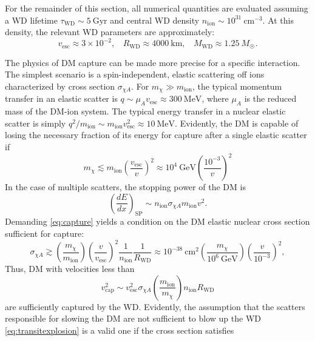 \documentclass[preprintnumbers,amsmath,amssymb,prd,superscriptaddress]{revtex4}
\newcommand{\GeV}{\text{GeV}}
\newcommand{\MeV}{\text{MeV}}
\newcommand{\cm}{\text{cm}}
\def\r{\right)}
\def\l{\left(}
\begin{document}
For the remainder of this section, all numerical quantities are evaluated assuming a WD lifetime $\tau_\text{WD} \sim 5 ~\text{Gyr}$ and central WD density $n_\text{ion} \sim 10^{31} ~\cm^{-3}$. 
At this density, the relevant WD parameters are approximately: 
\begin{equation}
v_\text{esc} \approx 3 \times 10^{-2}, ~~~~ R_\text{WD} \approx 4000 ~\text{km}, ~~~~ M_\text{WD} \approx 1.25 ~M_{\astrosun}. 
\end{equation}

The physics of DM capture can be made more precise for a specific interaction.
The simplest scenario is a spin-independent, elastic scattering off ions characterized by cross section $\sigma_{\chi A}$. 
For $m_\chi \gg m_\text{ion}$, the typical momentum transfer in an elastic scatter is $q \sim \mu_{A} v_\text{esc} \approx 300 ~\MeV$, where $\mu_{A}$ is the reduced mass of the DM-ion system. 
The typical energy transfer in a nuclear elastic scatter is simply $q^2/m_\text{ion} \sim m_\text{ion} v_\text{esc}^2 \approx 10 ~\MeV$. 
Evidently, the DM is capable of losing the necessary fraction of its energy for capture after a single elastic scatter if
\begin{equation}
m_\chi \lesssim m_\text{ion} \l \frac{v_\text{esc}}{v} \r^2 \approx 10^4 ~\GeV \l \frac{10^{-3}}{v} \r^2
\end{equation}
In the case of multiple scatters, the stopping power of the DM is
\begin{equation}
\left( \frac{d E}{d x} \right)_\text{SP} \sim n_\text{ion} \sigma_{\chi A} m_\text{ion} v^2.
\end{equation}
Demanding \eqref{eq:capture} yields a condition on the DM elastic nuclear cross section sufficient for capture:
\begin{equation}
\label{eq:capturecross}
\sigma_{\chi A} \gtrsim  \l \frac{m_\chi}{m_\text{ion}} \r \l \frac{v}{v_\text{esc}} \r^2 \frac{1}{n_\text{ion}} \frac{1}{R_\text{WD}} \approx 10^{-38} ~\cm^2 \l \frac{m_\chi}{10^{6} ~\GeV} \r \l \frac{v}{10^{-3}} \r^2,
\end{equation}
Thus, DM with velocities less than
\begin{equation}
v_\text{cap}^2 \sim v_\text{esc}^2 \sigma_{\chi A} \l \frac{m_\text{ion}}{m_\chi} \r n_\text{ion} R_\text{WD} 
\end{equation}
are sufficiently captured by the WD. 
Evidently, the assumption that the scatters responsible for slowing the DM are not sufficient to blow up the WD \eqref{eq:transitexplosion} is a valid one if the cross section satisfies
\end{document}
